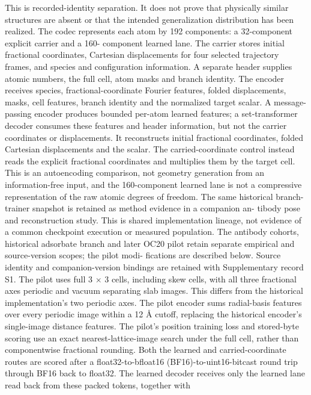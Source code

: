 \documentclass[11pt]{article}
\begin{document}
This is recorded-identity separation. It does not prove that physically similar structures are absent
or that the intended generalization distribution has been realized.
The codec represents each atom by 192 components: a 32-component explicit carrier and a 160-
component learned lane. The carrier stores initial fractional coordinates, Cartesian displacements
for four selected trajectory frames, and species and configuration information. A separate header
supplies atomic numbers, the full cell, atom masks and branch identity. The encoder receives
species, fractional-coordinate Fourier features, folded displacements, masks, cell features, branch
identity and the normalized target scalar. A message-passing encoder produces bounded per-atom
learned features; a set-transformer decoder consumes these features and header information, but
not the carrier coordinates or displacements. It reconstructs initial fractional coordinates, folded
Cartesian displacements and the scalar. The carried-coordinate control instead reads the explicit
fractional coordinates and multiplies them by the target cell. This is an autoencoding comparison,
not geometry generation from an information-free input, and the 160-component learned lane is
not a compressive representation of the raw atomic degrees of freedom.
The same historical branch-trainer snapshot is retained as method evidence in a companion an-
tibody pose and reconstruction study. This is shared implementation lineage, not evidence of a
common checkpoint execution or measured population. The antibody cohorts, historical adsorbate
branch and later OC20 pilot retain separate empirical and source-version scopes; the pilot modi-
fications are described below. Source identity and companion-version bindings are retained with
Supplementary record S1.
The pilot uses full 3 \ensuremath{\times} 3 cells, including skew cells, with all three fractional axes periodic and
vacuum separating slab images. This differs from the historical implementation’s two periodic
axes. The pilot encoder sums radial-basis features over every periodic image within a 12 Å cutoff,
replacing the historical encoder’s single-image distance features. The pilot’s position training loss
and stored-byte scoring use an exact nearest-lattice-image search under the full cell, rather than
componentwise fractional rounding. Both the learned and carried-coordinate routes are scored
after a float32-to-bfloat16 (BF16)-to-uint16-bitcast round trip through BF16 back to float32. The
learned decoder receives only the learned lane read back from these packed tokens, together with
\end{document}
